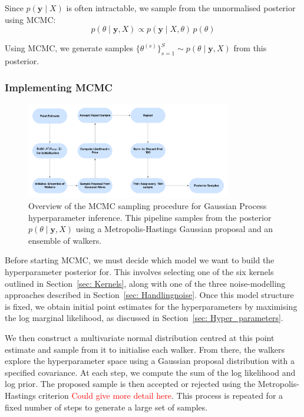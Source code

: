 \documentclass[11pt]{article}
\begin{document}
\noindent
Since \( p(\mathbf{y} \mid X) \) is often intractable, we sample from the unnormalised posterior using MCMC:
\[
p(\theta \mid \mathbf{y}, X) \propto p(\mathbf{y} \mid X, \theta) \, p(\theta)
\]

\noindent
Using MCMC, we generate samples \( \{\theta^{(s)}\}_{s=1}^S \sim p(\theta \mid \mathbf{y}, X) \) from this posterior.


\subsubsection*{Implementing MCMC}
\begin{figure}[H]
    \centering
    \includegraphics[width=0.8\textwidth]{LatexPlots/MCMC_Flow.png}
    \caption{Overview of the MCMC sampling procedure for Gaussian Process hyperparameter inference.
     This pipeline samples from the posterior \( p(\theta \mid \mathbf{y}, X) \) using a Metropolis-Hastings Gaussian proposal and an ensemble of walkers.}
    \label{fig:MCMC flowchart}
\end{figure}

\noindent
Before starting MCMC, we must decide which model we want to build the hyperparameter posterior for. This involves selecting one of the six kernels outlined in Section~\ref{sec: Kernels}, along with one of the three noise-modelling approaches described in Section~\ref{sec: Handlingnoise}. Once this model structure is fixed, we obtain initial point estimates for the hyperparameters by maximising the log marginal likelihood, as discussed in Section~\ref{sec: Hyper_parameters}.

\noindent
We then construct a multivariate normal distribution centred at this point estimate and sample from it to initialise each walker. From there, the walkers explore the hyperparameter space using a Gaussian proposal distribution with a specified covariance. At each step, we compute the sum of the log likelihood and log prior. The proposed sample is then accepted or rejected using the Metropolis-Hastings criterion \textcolor{red}{Could give more detail here}. This process is repeated for a fixed number of steps to generate a large set of samples.
\end{document}
